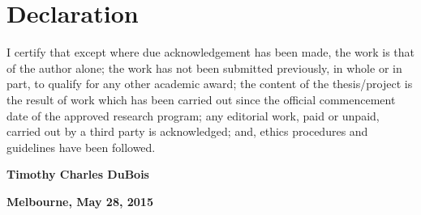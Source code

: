 \chapter{Declaration}
\vspace{3cm}
I certify that except where due acknowledgement has been made, the work is that of the author alone; the work has not been submitted previously, in whole or in part, to qualify for any other academic award; the content of the thesis/project is the result of work which has been carried out since the official commencement date of the approved research program; any editorial work, paid or unpaid, carried out by a third party is acknowledged; and, ethics procedures and guidelines have been followed.

\vspace{1cm}

\textbf{Timothy Charles DuBois}

\vspace{0.5cm}

\textbf{Melbourne, May 28, 2015}
